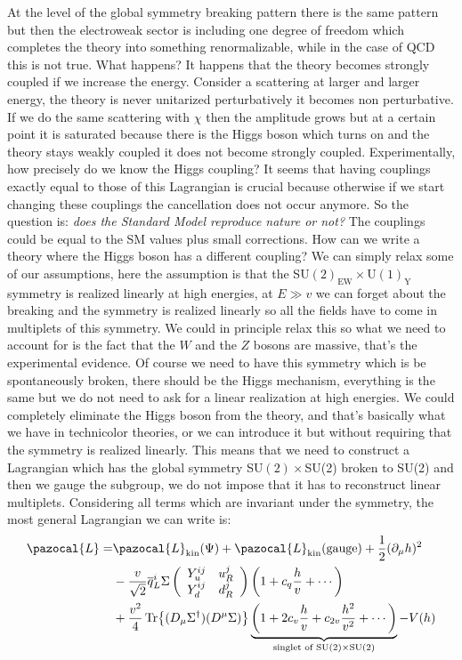 \documentclass[../main.tex]{subfiles}
\begin{document}
At the level of the global symmetry breaking pattern there is the same pattern but then the electroweak sector is including one degree of freedom which completes the theory into something renormalizable, while in the case of QCD this is not true. What happens? It happens that the theory becomes strongly coupled if we increase the energy. Consider a scattering at larger and larger energy, the theory is never unitarized perturbatively it becomes non perturbative. If we do the same scattering with $\chi$ then the amplitude grows but at a certain point it is saturated because there is the Higgs boson which turns on and the theory stays weakly coupled it does not become strongly coupled. Experimentally, how precisely do we know the Higgs coupling? It seems that having couplings exactly equal to those of this Lagrangian is crucial because otherwise if we start changing these couplings the cancellation does not occur anymore. So the question is: \textit{does the Standard Model reproduce nature or not?} The couplings could be equal to the SM values plus small corrections. How can we write a theory where the Higgs boson has a different coupling? We can simply relax some of our assumptions, here the assumption is that the SU$(2)_{\text{EW}}\times$U$(1)_{\text{Y}}$ symmetry is realized linearly at high energies, at $E\gg v$ we can forget about the breaking and the symmetry is realized linearly so all the fields have to come in multiplets of this symmetry. We could in principle relax this so what we need to account for is the fact that the $W$ and the $Z$ bosons are massive, that's the experimental evidence. Of course we need to have this symmetry which is be spontaneously broken, there should be the Higgs mechanism, everything is the same but we do not need to ask for a linear realization at high energies. We could completely eliminate the Higgs boson from the theory, and that's basically what we have in technicolor theories, or we can introduce it but without requiring that the symmetry is realized linearly. This means that we need to construct a Lagrangian which has the global symmetry SU$(2)\times$SU(2) broken to SU(2) and then we gauge the subgroup, we do not impose that it has to reconstruct linear multiplets. Considering all terms which are invariant under the symmetry, the most general Lagrangian we can write is:
\begin{align*}
\pazocal{L}=&\pazocal{L}_{\text{kin}}(\Psi)+\pazocal{L}_{\text{kin}}(\text{gauge})+\frac{1}{2}(\partial_\mu h)^2\\
&-\frac{v}{\sqrt{2}}\overline{q}_L^i\Sigma\left(\begin{array}{cc}
    Y_u^{ij} & u_R^j \\
    Y_d^{ij} & d_R^j
\end{array}\right)\left(1+c_q\frac{h}{v}+\cdots\right)\\
&+\frac{v^2}{4}\Tr{(D_\mu\Sigma^\dagger)(D^\mu\Sigma)}\underbrace{\left(1+2c_v\frac{h}{v}+c_{2v}\frac{h^2}{v^2}+\cdots\right)}_{\text{singlet of SU$(2)\times$SU(2)}}-V(h)
\end{align*}
\end{document}
